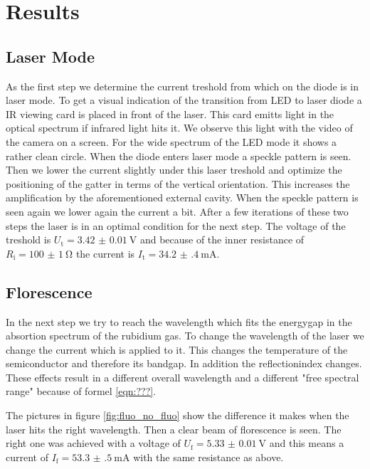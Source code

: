 \section{Results}
\label{sec:Auswertung}

\subsection{Laser Mode}

As the first step we determine the current treshold from which on the diode is in laser mode. To get a visual indication of the transition from LED to laser diode a IR viewing card is placed in front of the laser. This card emitts light in the optical spectrum if infrared light hits it. We observe this light with the video of the camera on a screen. For the wide spectrum of the LED mode it shows a rather clean circle. When the diode enters laser mode a speckle pattern is seen. Then we lower the current slightly under this laser treshold and optimize the positioning of the gatter in terms of the vertical orientation. This increases the amplification by the aforementioned external cavity. When the speckle pattern is seen again we lower again the current a bit. After a few iterations of these two steps the laser is in an optimal condition for the next step. The voltage of the treshold is $U_\text{t} = \SI{3.42(1)}{\volt}$ and because of the inner resistance of $R_\text{i} = \SI{100(1)}{\ohm}$ the current is $I_\text{t} = \SI{34.2(4)}{\milli\ampere}$.

\subsection{Florescence}

In the next step we try to reach the wavelength which fits the energygap in the absortion spectrum of the rubidium gas. To change the wavelength of the laser we change the current which is applied to it. This changes the temperature of the semiconductor and therefore its bandgap. In addition the reflectionindex changes. These effects result in a different overall wavelength and a different "free spectral range" because of formel \eqref{eqn:???}.

The pictures in figure \ref{fig:fluo_no_fluo} show the difference it makes when the laser hits the right wavelength. Then a clear beam of florescence is seen. The right one was achieved with a voltage of $U_\text{f} = \SI{5.33(1)}{\volt}$ and this means a current of $I_\text{f} = \SI{53.3(5)}{\milli\ampere}$ with the same resistance as above.

